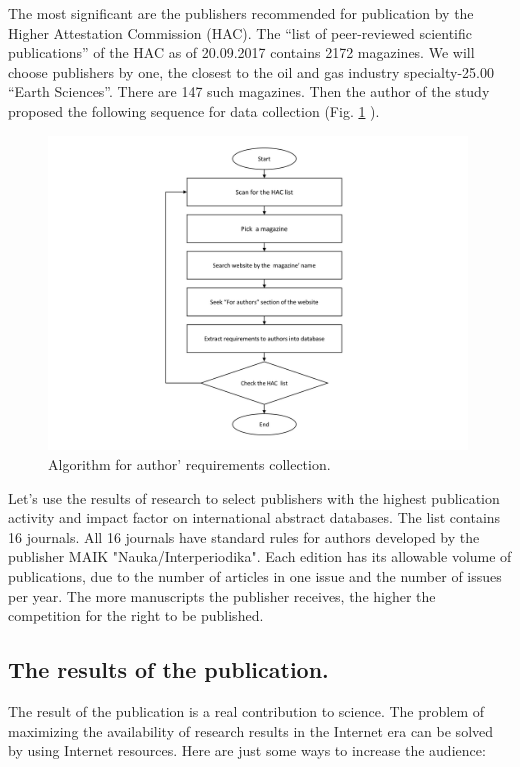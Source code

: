 \documentclass[12pt]{report}
\theoremstyle{definition}
\begin{document}
The most significant are the publishers recommended for publication by the Higher Attestation Commission (HAC). 
The ``list of peer-reviewed scientific publications'' of the HAC as of 20.09.2017 contains 2172 magazines. 
We will choose publishers by one, the closest to the oil and gas industry specialty-25.00 ``Earth Sciences''.
There are 147 such magazines. 
Then the author of the study proposed the following sequence for data collection (Fig. \ref{fig:om2_1} ).

\begin{figure}[ht]
	\centering
	\includegraphics[width=0.99\textwidth]{om2_1_eng}
	\caption{Algorithm for author' requirements collection.}
	\label{fig:om2_1}
\end{figure}  

Let's use the results of research \cite{mazov2015russian} to select publishers with the highest publication activity and impact factor on international abstract databases. 
The list contains 16 journals. 
All 16 journals have standard rules for authors developed by the publisher MAIK "Nauka/Interperiodika".
Each edition has its allowable volume of publications, due to the number of articles in one issue and the number of issues per year.
The more manuscripts the publisher receives, the higher the competition for the right to be published.

\subsection{The results of the publication.}

The result of the publication is a real contribution to science. 
The problem of maximizing the availability of research results in the Internet era can be solved by using Internet resources. 
Here are just some ways to increase the audience:
\end{document}
